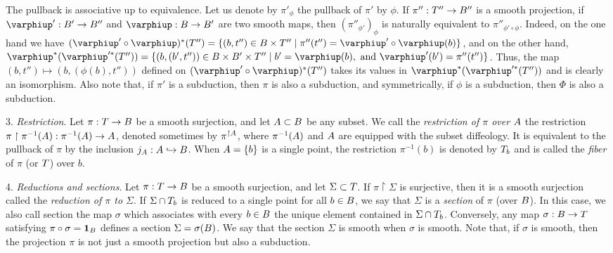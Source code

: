 \begin{article}
  \begin{center}
  \end{center}

  The pullback is associative up to equivalence.
  Let us denote by $\pi'_\phi$ the pullback of $\pi'$ by $\phi$.
  If $\pi'' : T'' \to B''$ is a smooth projection,
  if $\phi' : \B' \to \B''$ and $\phi : \B \to \B'$ are two smooth maps,
  then $(\pi''_{\phi'})_\phi$ is naturally equivalent to $\pi''_{\phi' \circ \phi}$.
  Indeed,
  on the one hand we have $(\phi' \circ \phi)^*(\T'') = \{ (b,t'') \in \B \times \T'' \mid \pi''(t'') = \phi' \circ \phi(b) \}$,
  and on the other hand, $\phi^*(\phi'^*(\T'')) = \{ (b, (b',t'')) \in \B \times \B' \times \T'' \mid b' = \phi(b), \text{ and } \phi'(b') = \pi''(t'') \}$.
  Thus,
  the map $(b,t'') \mapsto (b, (\phi(b), t''))$ defined on $(\phi' \circ \phi)^*(\T'')$ takes its values in $\phi^*(\phi'^*(\T''))$ and is clearly an isomorphism.
  Also note that,
  if $\pi'$ is a subduction, then $\pi$ is also a subduction,
  and symmetrically,
  if $\phi$ is a subduction,
  then $\Phi$ is also a subduction.
  
  3. {\em Restriction}.
  Let $\pi : T \to B$ be a smooth surjection,
  and let $A \subset B$ be any subset.
  We call the {\em restriction of $\pi$ over $A$} the restriction $\pi \restriction \pi^{-1}(A) : \pi^{-1}(A) \to A$,
  denoted sometimes by $\pi^{\restriction A}$,
  where $\pi^{-1}(A)$ and $A$ are equipped with the subset diffeology.
  It is equivalent to the pullback of $\pi$ by the inclusion $j_A : A \hookrightarrow B$.
  When $A = \{b\}$ is a single point,
  the restriction $\pi^{-1}(b)$ is denoted by $T_b$ and is called the {\em fiber} of $\pi$ (or $T$) over $b$.
  
  4. {\em Reductions and sections}.
  Let $\pi : T \to B$ be a smooth surjection,
  and let $\Sigma \subset T$.
  If $\pi \restriction \Sigma$ is surjective,
  then it is a smooth surjection called the {\em reduction of $\pi$ to $\Sigma$}.
  If $\Sigma \cap T_b$ is reduced to a single point for all $b \in B$,
  we say that $\Sigma$ is a {\em section} of $\pi$ (over $B$).
  In this case,
  we also call section the map $\sigma$ which associates with every $b \in B$ the unique element contained in $\Sigma \cap T_b$.
  Conversely,
  any map $\sigma : B \to T$ satisfying $\pi \circ \sigma = {\bf 1}_B$ defines a section $\Sigma = \sigma(B)$.
  We say that the section $\Sigma$ is smooth when $\sigma$ is smooth.
  Note that,
  if $\sigma$ is smooth,
  then the projection $\pi$ is not just a smooth projection but also a subduction.
  

\end{article}
